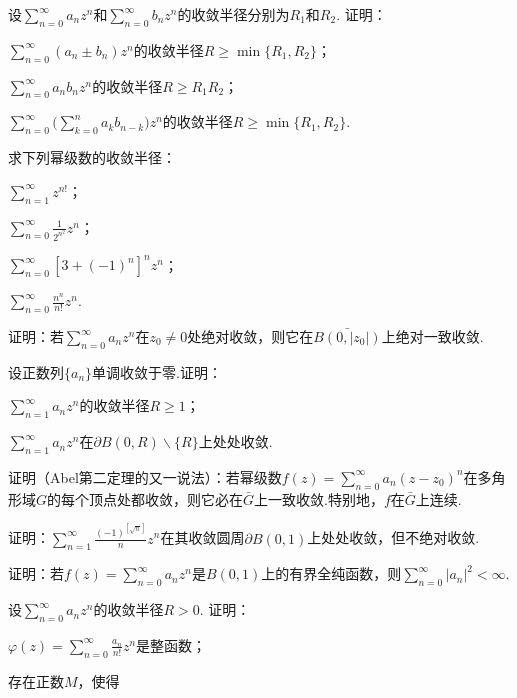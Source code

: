\begin{xiti}
  \item 设$\sum_{n=0}^\infty a_nz^n$和$\sum_{n=0}^\infty b_nz^n$的收敛半径分别为$R_1$和$R_2$. 证明：
    \begin{enuma}
      \item $\sum_{n=0}^\infty(a_n\pm b_n)z^n$的收敛半径$R\ge\min\{R_1,R_2\}$；
      \item $\sum_{n=0}^\infty a_nb_nz^n$的收敛半径$R\ge R_1R_2$；
      \item $\sum_{n=0}^\infty\bigg(\sum_{k=0}^na_kb_{n-k}\bigg)z^n$的收敛半径$R\ge\min\{R_1,R_2\}$.
    \end{enuma}
  \item 求下列幂级数的收敛半径：
    \begin{enuma}
      \item $\sum_{n=1}^\infty z^{n!}$；
      \item $\sum_{n=0}^\infty\frac1{2^{n^2}}z^n$；
      \item $\sum_{n=0}^\infty[3+(-1)^n]^nz^n$；
      \item $\sum_{n=0}^\infty\frac{n^n}{n!}z^n$.
    \end{enuma}
  \item 证明：若$\sum_{n=0}^\infty a_nz^n$在$z_0\ne0$处绝对收敛，则它在$\bar{B(0,|z_0|)}$上绝对一致收敛.
  \item 设正数列$\{a_n\}$单调收敛于零.证明：
    \begin{enuma}
      \item $\sum_{n=1}^\infty a_nz^n$的收敛半径$R\ge1$；
      \item $\sum_{n=1}^\infty a_nz^n$在$\partial B(0,R)\backslash\{R\}$上处处收敛.
    \end{enuma}
  \item 证明（Abel第二定理的又一说法）：若幂级数$f(z)=\sum_{n=0}^\infty a_n(z-z_0)^n$在多角形域$G$的每个顶点处都收敛，则它必在$\bar G$上一致收敛.特别地，$f$在$\bar G$上连续.
  \item 证明：$\sum_{n=1}^\infty \frac{(-1)^{[\sqrt n]}}nz^n$在其收敛圆周$\partial B(0,1)$上处处收敛，但不绝对收敛.
  \item 证明：若$f(z)=\sum_{n=0}^\infty a_nz^n$是$B(0,1)$上的有界全纯函数，则$\sum_{n=0}^\infty|a_n|^2<\infty$.
  \item 设$\sum_{n=0}^\infty a_nz^n$的收敛半径$R>0$. 证明：
    \begin{enuma}
      \item $\varphi(z)=\sum_{n=0}^\infty\frac{a_n}{n!}z^n$是整函数；
      \item 存在正数$M$，使得

\end{enuma}
\end{xiti}
